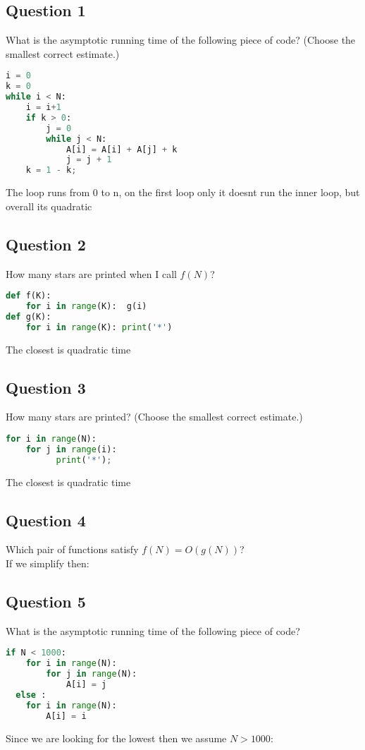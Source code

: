 \subsection{Question 1}
What is the asymptotic running time of the following piece of code? (Choose the smallest correct estimate.)

\begin{lstlisting}[language=python]
i = 0
k = 0
while i < N:
    i = i+1
    if k > 0:
        j = 0 
        while j < N: 
            A[i] = A[i] + A[j] + k
            j = j + 1
    k = 1 - k;
\end{lstlisting}
The loop runs from 0 to n, on the first loop only it doesnt run the inner loop, but overall its quadratic\\[1ex]


\subsection{Question 2}
How many stars are printed when I call $f(N)$?
\begin{lstlisting}[language=python]
def f(K):
    for i in range(K):  g(i)
def g(K):
    for i in range(K): print('*')
\end{lstlisting}
The closest is quadratic time\\[1ex]


\subsection{Question 3}
How many stars are printed? (Choose the smallest correct estimate.)
\begin{lstlisting}[language=python]
for i in range(N):
    for j in range(i):
          print('*');
\end{lstlisting}
The closest is quadratic time\\[1ex]

\subsection{Question 4}
Which pair of functions satisfy $f(N)=O(g(N))$?\\
If we simplify then:\\[1ex]


\subsection{Question 5}
What is the asymptotic running time of the following piece of code?
\begin{lstlisting}[language=python]
if N < 1000: 
    for i in range(N):
        for j in range(N):
            A[i] = j
  else :
    for i in range(N):
        A[i] = i
\end{lstlisting}
Since we are looking for the lowest then we assume $N>1000$:\\[1ex]


